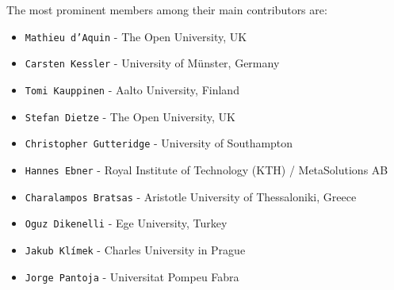 \documentclass{article}
\begin{document}
The most prominent members among their main contributors are:
\begin{itemize}
	\item \texttt{Mathieu d'Aquin} - The Open University, UK
	\item \texttt{Carsten Kessler} - University of Münster, Germany
	\item \texttt{Tomi Kauppinen} - Aalto University, Finland
	\item \texttt{Stefan Dietze} - The Open University, UK
	\item \texttt{Christopher Gutteridge} - University of Southampton
	\item \texttt{Hannes Ebner} - Royal Institute of Technology (KTH) / MetaSolutions AB
	\item \texttt{Charalampos Bratsas} - Aristotle University of Thessaloniki, Greece
	\item \texttt{Oguz Dikenelli} - Ege University, Turkey
	\item \texttt{Jakub Klímek} - Charles University in Prague
	\item \texttt{Jorge Pantoja} - Universitat Pompeu Fabra
\end{itemize}
\end{document}
